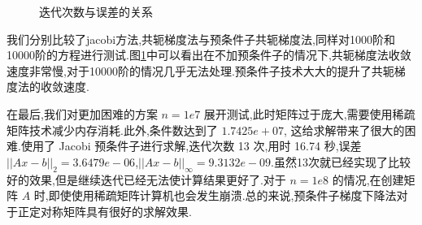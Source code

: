 \documentclass[a4paper]{article}
\numberwithin{equation}{section}
\begin{document}
\begin{figure}[htbp]
    \centering
    \quad %
    \caption{迭代次数与误差的关系}
    \label{fig:condition}
\end{figure}
我们分别比较了jacobi方法,共轭梯度法与预条件子共轭梯度法,同样对1000阶和10000阶的方程进行测试.图\ref{fig:condition}中可以看出在不加预条件子的情况下,共轭梯度法收敛速度非常慢,对于10000阶的情况几乎无法处理.预条件子技术大大的提升了共轭梯度法的收敛速度.

在最后,我们对更加困难的方案 $n=1e7$ 展开测试,此时矩阵过于庞大,需要使用稀疏矩阵技术减少内存消耗.此外,条件数达到了 $1.7425e+07$, 这给求解带来了很大的困难.使用了 Jacobi 预条件子进行求解,迭代次数 13 次,用时 16.74 秒,误差 $||Ax-b||_2=3.6479e-06$,$||Ax-b||_\infty = 9.3132e-09$.虽然13次就已经实现了比较好的效果,但是继续迭代已经无法使计算结果更好了.对于 $n=1e8$ 的情况,在创建矩阵 $A$ 时,即使使用稀疏矩阵计算机也会发生崩溃.总的来说,预条件子梯度下降法对于正定对称矩阵具有很好的求解效果.
\end{document}
